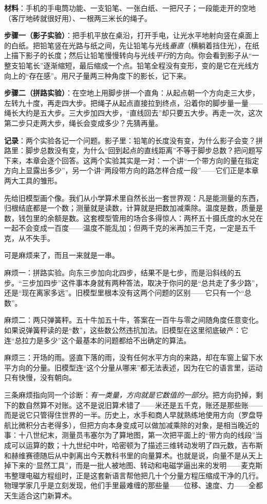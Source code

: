 
\begin{experiment}
\textbf{材料}：手机的手电筒功能、一支铅笔、一张白纸、一把尺子；一段能走开的空地（客厅地砖就很好用）、一根两三米长的绳子。

\textbf{步骤一（影子实验）}：把手机平放在桌沿，打开手电，让光水平地射向竖在桌面上的白纸。把铅笔竖在光路与纸之间，先让铅笔与光线\emph{垂直}（横躺着挡住光），在纸上描下影子的长度；然后让铅笔慢慢转向与光线\emph{平行}的方向。你会看到影子从“一整支铅笔长”逐渐缩短，最后缩成一个点。铅笔全程没有变形，变的是它在光线方向上的“存在感”。用尺子量两三种角度下的影长，记下来。

\textbf{步骤二（拼路实验）}：在空地上用脚步拼一个直角：从起点朝一个方向走三大步，左转九十度，再走四大步。把绳子从起点直接拉到终点，沿着你的脚步量一量——绳长大约是五大步。三大步加四大步，“直线回去”却只要五大步。再走一次，这次第二步只走两大步，绳长会变成多少？先猜再量。

\textbf{记录}：两个实验各记一个问题。影子里：铅笔的长度没有变，为什么影子会变？拼路里：脚步总数没有变，为什么“回到起点的直线距离”不等于脚步总数？把问题写下来，本章会逐个回答。这两个实验其实是一对：一个讲“一个带方向的量在指定方向上显露出多少”，另一个讲“两段带方向的路怎样合成一段”——它们正是本章两大工具的雏形。
\end{experiment}


先给旧模型画个像。我们从小学算术里自然长出一套世界观：凡是能测量的东西，归根结底都是一个数；测量就是读数，计算就是把数加减乘除。温度是数，质量是数，钱包里的余额是数。这套模型管用的场合多得惊人：两杯五十摄氏度的水兑在一起不会变成一百度——温度不能乱加；但两千克的米再加三千克，一定是五千克，从不失手。

可是麻烦来了，而且一来就是一串。

麻烦一：拼路实验。向东三步加向北四步，结果不是七步，而是沿斜线的五步。“三步加四步”这件事本身就有两种答法，取决于你问的是“总共走了多少路”，还是“现在离家多远”。旧模型里根本没有这两个问题的区别——它只有一个“总数”。

麻烦二：两只弹簧秤。五十牛加五十牛，答案在一百牛与零之间随角度任意变化。如果说弹簧秤读的是“数”，这些数公然违抗加法。旧模型在这里彻底破产：它连“总拉力是多少”这个最基本的问题都给不出确定的算法。

麻烦三：开场的雨。竖直下落的雨，没有任何水平方向的来路，却在车窗上留下水平方向的分量。旧模型连“这个分量从哪来”都无法表述，因为在它的语言里，运动只有快慢，没有朝向。

三条麻烦指向同一个诊断：\emph{有一类量，方向就是它数值的一部分}。把方向扔掉，剩下的数自然算不对账。这不是说旧算术错了——米还是五千克，账还是那些账——而是说它只管得住世界的一半。历史上，水手和商人早就熟练地使用方向（罗盘导航比微积分古老得多），但把方向本身变成可以做加减乘除的对象，是相当晚近的事：十八世纪末，测量员韦塞尔为了算地图，第一次把平面上的“带方向的线段”当成可以运算的数；十九世纪中叶，哈密顿为了描述三维转动发明了四元数，吉布斯和赫维赛德随后从中剥离出今天教科书里的向量算术。也就是说，向量不是从天上掉下来的“显然工具”，而是一批人被地图、转动和电磁学逼出来的发明——麦克斯韦整理电磁方程组时，正是这套新语言帮他把几十个分量方程压缩成干净的几行。物理学家几乎是立刻发现，他们手里最难缠的那些量——位移、速度、力——全都天生适合这门新算术。


